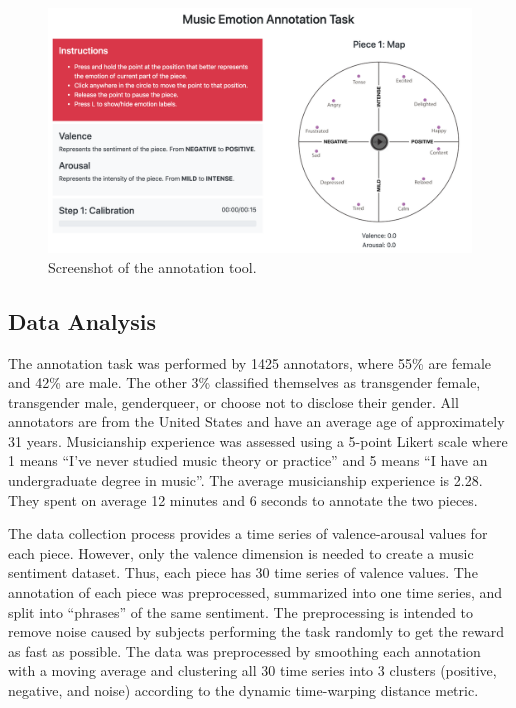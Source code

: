 \begin{figure}
 \centering
 \includegraphics[width=\columnwidth]{imgs/ismir19/annotation_tool.png}
 \caption{Screenshot of the annotation tool.}
 \label{fig:annotation_main}
\end{figure}

\subsection{Data Analysis}
\label{sec:data_analysys}

The annotation task was performed by 1425 annotators, where 55\% are female and 42\% are male. The other 3\% classified themselves as transgender female, transgender male, genderqueer, or choose not to disclose their gender. All annotators are from the United States and have an average age of approximately 31 years. Musicianship experience was assessed using a 5-point Likert scale where 1 means ``I've never studied music theory or practice'' and 5 means ``I have an undergraduate degree in music''. The average musicianship experience is 2.28. They spent on average 12 minutes and 6 seconds to annotate the two pieces.

The data collection process provides a time series of valence-arousal values for each piece. However, only the valence dimension is needed to create a music sentiment dataset. Thus, each piece has 30 time series of valence values. The annotation of each piece was preprocessed, summarized into one time series, and split into ``phrases'' of the same sentiment. The preprocessing is intended to remove noise caused by subjects performing the task randomly to get the reward as fast as possible. The data was preprocessed by smoothing each annotation with a moving average and clustering all 30 time series into 3 clusters (positive, negative, and noise) according to the dynamic time-warping distance metric.

